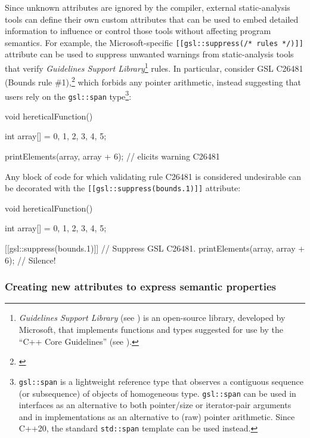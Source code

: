 Since unknown attributes are ignored by the compiler, external
static-analysis tools can define their own custom attributes that can be
used to embed detailed information to influence or control those tools
without affecting program semantics. For example, the Microsoft-specific
\lstinline![[gsl::suppress(/*!~\lstinline!rules!~\lstinline!*/)]]! attribute can
be used to suppress unwanted warnings from static-analysis tools that
verify \emph{Guidelines Support Library}{\cprotect\footnote{\emph{Guidelines
Support Library} (see \cite{microsoft}) is an open-source library, developed by Microsoft,
that implements functions and types suggested for use by the ``C++
  Core Guidelines'' (see \cite{stroustrup20}).}}
rules. In particular, consider GSL C26481 (Bounds rule \#1),\footnote{\cite{microsoftC26481}} which forbids any pointer arithmetic, instead
suggesting that users rely on the \lstinline!gsl::span!
type{\cprotect\footnote{\lstinline!gsl::span! is a lightweight reference
type that observes a contiguous sequence (or subsequence) of objects
of homogeneous type. \lstinline!gsl::span! can be used in interfaces as
an alternative to both pointer/size or iterator-pair arguments and in
implementations as an alternative to (raw) pointer arithmetic. Since
  C++20, the standard \lstinline!std::span! template can be used instead.}}:

\begin{emcppslisting}[language=C++]
void hereticalFunction()
{
    int array[] = {0, 1, 2, 3, 4, 5};

    printElements(array, array + 6);  // elicits warning C26481
}
\end{emcppslisting}
    
\noindent Any block of code for which validating rule C26481 is considered
undesirable can be decorated with the
\lstinline![[gsl::suppress(bounds.1)]]! attribute:

\begin{emcppslisting}[language=C++]
void hereticalFunction()
{
    int array[] = {0, 1, 2, 3, 4, 5};

    [[gsl::suppress(bounds.1)]]           // Suppress GSL C26481.
    {
        printElements(array, array + 6);  // Silence!
    }
}
\end{emcppslisting}
    

\subsubsection[Creating new attributes to express semantic properties]{Creating new attributes to express semantic properties}\label{creating-new-attributes-to-express-semantic-properties}

